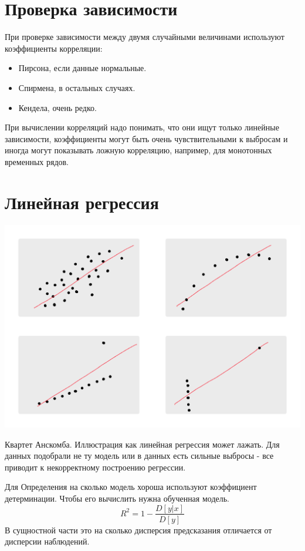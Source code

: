 \documentclass[a4paper, oneside]{book}
\begin{document}
\section{Проверка зависимости}
При проверке зависимости между двумя случайными величинами используют коэффициенты корреляции:
\begin{itemize}
    \item Пирсона, если данные нормальные.
    \item Спирмена, в остальных случаях.
    \item Кендела, очень редко.
\end{itemize}

При вычислении корреляций надо понимать, что они ищут только линейные зависимости, коэффициенты могут быть очень чувствительными к выбросам и иногда могут показывать ложную корреляцию, например, для монотонных временных рядов.

\section{Линейная регрессия}
\begin{marginfigure}
    \includegraphics[width=1\columnwidth]{pics/anscombe_quartet.pdf}
    \caption{Квартет Анскомба. Иллюстрация как линейная регрессия может лажать. Для данных подобрали не ту модель или в данных есть сильные выбросы - все приводит к некорректному построению регрессии.}
    \label{fig:anscombe}
\end{marginfigure}

Для Определения на сколько модель хороша используют коэффициент детерминации. Чтобы его вычислить нужна обученная модель.
\begin{equation}
    \label{eq:coeff_of_determination}
    R^2 = 1 - \frac{D[y|x]}{D[y]}
\end{equation}
В сущностной части это на сколько дисперсия предсказания отличается от дисперсии наблюдений.
\end{document}
